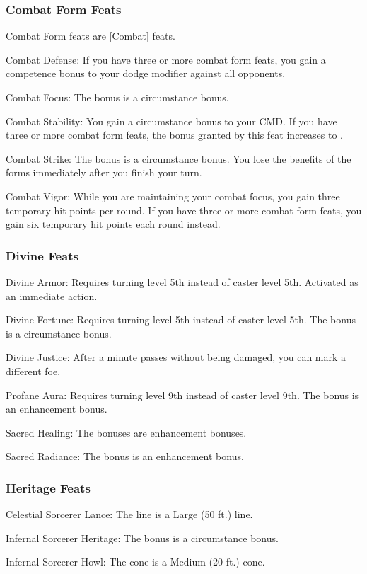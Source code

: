 \subsubsection{Combat Form Feats}
Combat Form feats are [Combat] feats.
\begin{itemize*}
\item Combat Defense: If you have three or more combat form feats, you gain a  competence bonus to your dodge modifier against all opponents.
\item Combat Focus: The bonus is a circumstance bonus.
\item Combat Stability: You gain a  circumstance bonus to your CMD. If you have three or more combat form feats, the bonus granted by this feat increases to .
\item Combat Strike: The bonus is a circumstance bonus. You lose the benefits of the forms immediately after you finish your turn.
\item Combat Vigor: While you are maintaining your combat focus, you gain three temporary hit points per round. If you have three or more combat form feats, you gain six temporary hit points each round instead.
\end{itemize*}
\subsubsection{Divine Feats}
\begin{itemize*}
\item Divine Armor: Requires turning level 5th instead of caster level 5th. Activated as an immediate action.
\item Divine Fortune: Requires turning level 5th instead of caster level 5th. The bonus is a circumstance bonus.
\item Divine Justice: After a minute passes without being damaged, you can mark a different foe.
\item Profane Aura: Requires turning level 9th instead of caster level 9th. The bonus is an enhancement bonus.
\item Sacred Healing: The bonuses are enhancement bonuses.
\item Sacred Radiance: The bonus is an enhancement bonus.
\end{itemize*}
\subsubsection{Heritage Feats}
\begin{itemize*}
\item Celestial Sorcerer Lance: The line is a Large (50 ft.) line.
\item Infernal Sorcerer Heritage: The bonus is a circumstance bonus.
\item Infernal Sorcerer Howl: The cone is a Medium (20 ft.) cone.
\end{itemize*}
